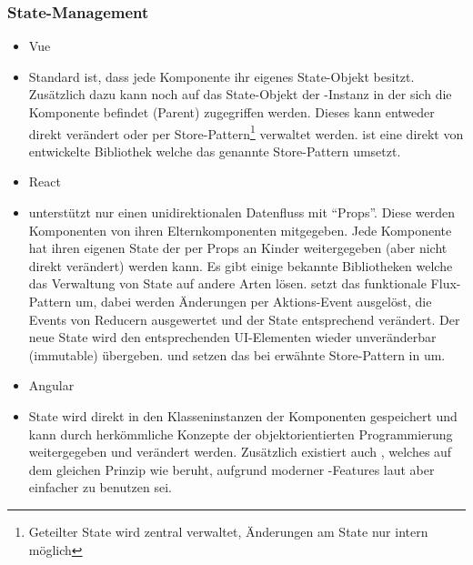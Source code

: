 \subsubsection{State-Management}
\begin{itemize}
    \item{Vue}
    \item[] Standard ist, dass jede Komponente ihr eigenes State-Objekt besitzt. Zusätzlich dazu kann noch auf das State-Objekt der -Instanz in der sich die Komponente befindet (Parent) zugegriffen werden. Dieses kann entweder direkt verändert oder per Store-Pattern\footnote{Geteilter State wird zentral verwaltet, Änderungen am State nur intern möglich} verwaltet werden.  ist eine direkt von  entwickelte Bibliothek welche das genannte Store-Pattern umsetzt.
    \item{React}
    \item[]  unterstützt nur einen unidirektionalen Datenfluss mit ``Props''. Diese werden Komponenten von ihren Elternkomponenten mitgegeben. Jede Komponente hat ihren eigenen State der per Props an Kinder weitergegeben (aber nicht direkt verändert) werden kann. Es gibt einige bekannte Bibliotheken welche das Verwaltung von State auf andere Arten lösen.  setzt das funktionale Flux-Pattern um, dabei werden Änderungen per Aktions-Event ausgelöst, die Events von Reducern ausgewertet und der State entsprechend verändert. Der neue State wird den entsprechenden UI-Elementen wieder unveränderbar (immutable) übergeben.  und  setzen das bei  erwähnte Store-Pattern in  um.
    \item{Angular}
    \item[] State wird direkt in den Klasseninstanzen der Komponenten gespeichert und kann durch herkömmliche Konzepte der objektorientierten Programmierung weitergegeben und verändert werden. Zusätzlich existiert auch , welches auf dem gleichen Prinzip wie  beruht, aufgrund moderner -Features laut  aber einfacher zu benutzen sei.
\end{itemize}

